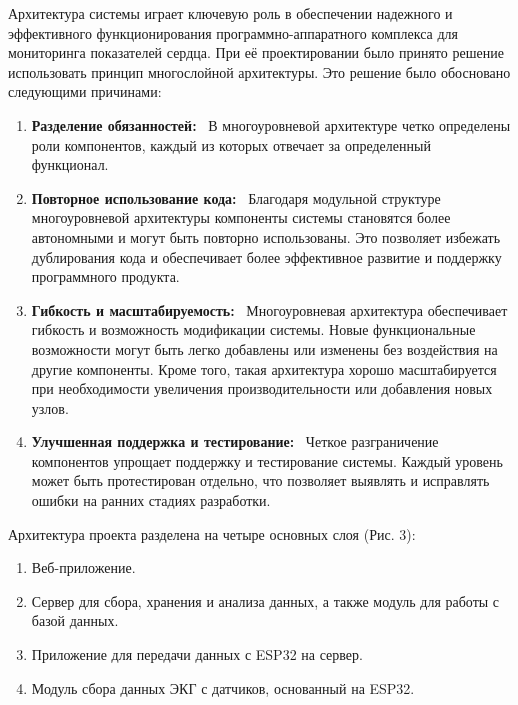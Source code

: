 \documentclass[12pt, russian]{extarticle}
\begin{document}
\begin{spacing}{1.5}
Архитектура системы играет ключевую роль в обеспечении надежного и эффективного функционирования программно-аппаратного комплекса для мониторинга показателей сердца. При её проектировании было принято решение использовать принцип многослойной архитектуры. Это решение было обосновано следующими причинами:

\begin{enumerate}
    \item \textbf{Разделение обязанностей:} \
        В многоуровневой архитектуре четко определены роли компонентов, каждый из которых отвечает за определенный функционал.
    \item \textbf{Повторное использование кода:} \
        Благодаря модульной структуре многоуровневой архитектуры компоненты системы становятся более автономными и могут быть повторно использованы. Это позволяет избежать дублирования кода и обеспечивает более эффективное развитие и поддержку программного продукта.
    \item \textbf{Гибкость и масштабируемость:} \
        Многоуровневая архитектура обеспечивает гибкость и возможность модификации системы. Новые функциональные возможности могут быть легко добавлены или изменены без воздействия на другие компоненты. Кроме того, такая архитектура хорошо масштабируется при необходимости увеличения производительности или добавления новых узлов.
    \item \textbf{Улучшенная поддержка и тестирование:} \
        Четкое разграничение компонентов упрощает поддержку и тестирование системы. Каждый уровень может быть протестирован отдельно, что позволяет выявлять и исправлять ошибки на ранних стадиях разработки.
\end{enumerate}

\noindent Архитектура проекта разделена на четыре основных слоя (Рис. 3):

\begin{enumerate}
    \item Веб-приложение.
    \item Сервер для сбора, хранения и анализа данных, а также модуль для работы с базой данных.
    \item Приложение для передачи данных с ESP32 на сервер.
    \item Модуль сбора данных ЭКГ с датчиков, основанный на ESP32.
\end{enumerate}

\newpage


\end{spacing}
\end{document}
